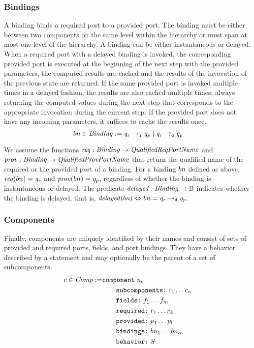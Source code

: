 \documentclass[a4paper,10pt,english]{article}
\begin{document}
\subsubsection{Bindings}
A binding binds a required port to a provided port. The binding must be either between two components on the
same level within the hierarchy or must span at most one level of the hierarchy. A binding can be either
instantaneous or delayed. When a required port with a delayed binding is invoked, the corresponding provided port is executed
at the beginning of the next step with the provided parameters, the computed results are cached and the results of the invocation
of the previous state are returned. If the same provided port is invoked multiple times in a delayed fashion, the results are also
cached multiple times, always returning the computed values during the next step that corresponds to the appropriate invocation
during the current step. If the provided port does not have any incoming parameters, it suffices to cache the results once.
\begin{equation*} 
	bn \in \mathit{Binding} := \mathit{q_r} \; \mathtt{\rightarrow_i} \; \mathit{q_p} \mid
		\mathit{q_r} \; \mathtt{\rightarrow_d} \; \mathit{q_p}
\end{equation*}

We assume the functions $\mathit{req} : \mathit{Binding} \rightarrow \mathit{QualifiedReqPortName}$ and $\mathit{prov} : \mathit{Binding} \rightarrow \mathit{QualifiedProvPortName}$ that return
the qualified name of the required or the provided port of a binding. For a binding $bn$ defined as above, $\mathit{req}(bn) =
\mathit{q_r}$ and $\mathit{prov}(bn) = \mathit{q_p}$, regardless of whether the binding is instantaneous or delayed. The
predicate $\mathit{delayed} : \mathit{Binding} \rightarrow \mathbb{B}$ indicates whether the binding is delayed, that is, $\mathit{delayed}(bn) \Leftrightarrow
bn = \mathit{q_r} \; \mathtt{\rightarrow_d} \; \mathit{q_p}$.

\subsubsection{Components}
Finally, components are uniquely identified by their names and consist of sets
of provided and required ports, fields, and port bindings. They have a behavior described by a statement and may optionally be
the parent of a set of subcomponents.
\begin{align*}
	c \in \mathit{Comp} := & 
		\texttt{component} \; \mathit{n_c}\\&\qquad \texttt{subcomponents:} \; c_1 \ldots c_n\\&\qquad \texttt{fields:} \; f_1 \ldots f_m\\&\qquad \texttt{required:} \; r_1 \ldots r_k\\&\qquad \texttt{provided:} \; p_1 \ldots p_l\\&\qquad \texttt{bindings:} \; bn_1 \ldots bn_o\\&\qquad \texttt{behavior:} \; S
\end{align*}
\end{document}
